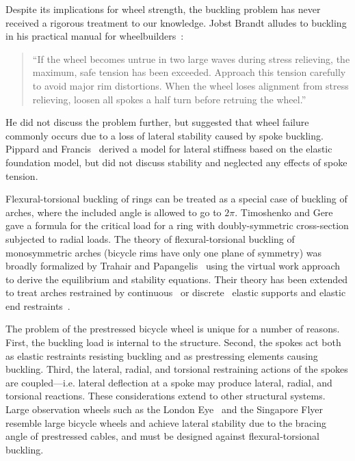 \documentclass{bmd2016p}
\begin{document}
Despite its implications for wheel strength, the buckling problem has never received a rigorous treatment to our knowledge. Jobst Brandt alludes to buckling in his practical manual for wheelbuilders~\cite{Brandt1993c}:

\begin{quotation}
\noindent``If the wheel becomes untrue in two large waves during stress relieving, the maximum, safe tension has been exceeded. Approach this tension carefully to avoid major rim distortions. When the wheel loses alignment from stress relieving, loosen all spokes a half turn before retruing the wheel.''
\end{quotation}

He did not discuss the problem further, but suggested that wheel failure commonly occurs due to a loss of lateral stability caused by spoke buckling. Pippard and Francis~\cite{Pippard1932d} derived a model for lateral stiffness based on the elastic foundation model, but did not discuss stability and neglected any effects of spoke tension.

Flexural-torsional buckling of rings can be treated as a special case of buckling of arches, where the included angle is allowed to go to $2\pi$. Timoshenko and Gere~\cite{Timoshenko1961a} gave a formula for the critical load for a ring with doubly-symmetric cross-section subjected to radial loads. The theory of flexural-torsional buckling of monosymmetric arches (bicycle rims have only one plane of symmetry) was broadly formalized by Trahair and Papangelis~\cite{Trahair1987b} using the virtual work approach to derive the equilibrium and stability equations. Their theory has been extended to treat arches restrained by continuous~\cite{Pi2002b} or discrete~\cite{Bradford2002d} elastic supports and elastic end restraints~\cite{Guo2014b}.

The problem of the prestressed bicycle wheel is unique for a number of reasons. First, the buckling load is internal to the structure. Second, the spokes act both as elastic restraints resisting buckling and as prestressing elements causing buckling. Third, the lateral, radial, and torsional restraining actions of the spokes are coupled---i.e. lateral deflection at a spoke may produce lateral, radial, and torsional reactions. These considerations extend to other structural systems. Large observation wheels such as the London Eye~\cite{Mann2001a} and the Singapore Flyer~\cite{Allsop2009a} resemble large bicycle wheels and achieve lateral stability due to the bracing angle of prestressed cables, and must be designed against flexural-torsional buckling.
\end{document}
